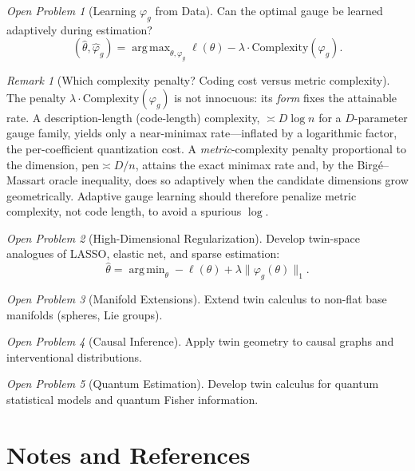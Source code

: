 \documentclass[11pt,twoside]{book}
\theoremstyle{plain}
\theoremstyle{definition}
\theoremstyle{remark}
\newtheorem{remark}[theorem]{Remark}
\newtheorem{openproblem}{Open Problem}[chapter]
\DeclareMathOperator*{\argmin}{arg\,min}
\DeclareMathOperator*{\argmax}{arg\,max}
\begin{document}
\begin{openproblem}[Learning $\varphi_g$ from Data]
    Can the optimal gauge be learned adaptively during estimation?
    \[
    (\hat{\theta}, \hat{\varphi}_g) = \argmax_{\theta, \varphi_g} \ell(\theta) - \lambda \cdot \text{Complexity}(\varphi_g).
    \]
\end{openproblem}

\begin{remark}[Which complexity penalty? Coding cost versus metric complexity]
    The penalty $\lambda\cdot\text{Complexity}(\varphi_g)$ is not innocuous: its
    \emph{form} fixes the attainable rate. A description-length (code-length)
    complexity, $\asymp D\log n$ for a $D$-parameter gauge family, yields only a
    near-minimax rate---inflated by a logarithmic factor, the per-coefficient
    quantization cost. A \emph{metric}-complexity penalty proportional to the
    dimension, $\text{pen}\asymp D/n$, attains the exact minimax rate and, by the
    Birg\'e--Massart oracle inequality, does so adaptively when the candidate
    dimensions grow geometrically. Adaptive gauge learning should therefore
    penalize metric complexity, not code length, to avoid a spurious $\log$.
\end{remark}

\begin{openproblem}[High-Dimensional Regularization]
    Develop twin-space analogues of LASSO, elastic net, and sparse estimation:
    \[
    \hat{\theta} = \argmin_{\theta} -\ell(\theta) + \lambda \|\varphi_g(\theta)\|_1.
    \]
\end{openproblem}

\begin{openproblem}[Manifold Extensions]
    Extend twin calculus to non-flat base manifolds (spheres, Lie groups).
\end{openproblem}

\begin{openproblem}[Causal Inference]
    Apply twin geometry to causal graphs and interventional distributions.
\end{openproblem}

\begin{openproblem}[Quantum Estimation]
    Develop twin calculus for quantum statistical models and quantum Fisher information.
\end{openproblem}

\section{Notes and References}
\label{sec:ch19_notes}
\end{document}
